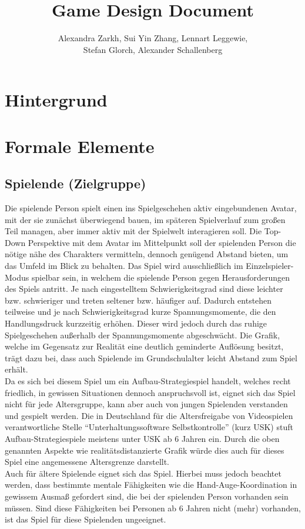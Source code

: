 \documentclass[paper=A4,pagesize=auto,12pt,headinclude=true,footinclude=true,BCOR=0mm,DIV=calc]{scrartcl}
\title{Game Design Document}
\author{Alexandra Zarkh, Sui Yin Zhang, Lennart Leggewie,\\ Stefan Glorch, Alexander Schallenberg}
\newcommand{\sectionspace}{
	\vspace{0.5cm}
}
\begin{document}
	
\begin{titlepage}
	\maketitle
\end{titlepage}


\tableofcontents
\newpage

\section{Hintergrund}\label{sec:Hintergrund}

\sectionspace
\section{Formale Elemente}\label{sec:Formale_Elemente}

\sectionspace
\subsection{Spielende (Zielgruppe)}\label{sec:Spieler}
Die spielende Person spielt einen ins Spielgeschehen aktiv eingebundenen Avatar, mit der sie zunächst überwiegend bauen, im späteren Spielverlauf zum großen Teil managen, aber immer aktiv mit der Spielwelt interagieren soll. Die Top-Down Perspektive mit dem Avatar im Mittelpunkt soll der spielenden Person die nötige nähe des Charakters vermitteln, dennoch genügend Abstand bieten, um das Umfeld im Blick zu behalten. Das Spiel wird ausschließlich im Einzelspieler-Modus spielbar sein, in welchem die spielende Person gegen Herausforderungen des Spiels antritt. Je nach eingestelltem Schwierigkeitsgrad sind diese leichter bzw. schwieriger und treten seltener bzw. häufiger auf. Dadurch entstehen teilweise und je nach Schwierigkeitsgrad kurze Spannungsmomente, die den Handlungsdruck kurzzeitig erhöhen. Dieser wird jedoch durch das ruhige Spielgeschehen außerhalb der Spannungsmomente abgeschwächt. Die Grafik, welche im Gegensatz zur Realität eine deutlich geminderte Auflösung besitzt, trägt dazu bei, dass auch Spielende im Grundschulalter leicht Abstand zum Spiel erhält.\\ %
Da es sich bei diesem Spiel um ein Aufbau-Strategiespiel handelt, welches recht friedlich, in gewissen Situationen dennoch anspruchsvoll ist, eignet sich das Spiel nicht für jede Altersgruppe, kann aber auch von jungen Spielenden verstanden und gespielt werden. Die in Deutschland für die Altersfreigabe von Videospielen verantwortliche Stelle ``Unterhaltungssoftware Selbstkontrolle'' (kurz USK) stuft Aufbau-Strategiespiele meistens unter USK ab 6 Jahren \cite{usk_6} ein. Durch die oben genannten Aspekte wie realitätsdistanzierte Grafik würde dies auch für dieses Spiel eine angemessene Altersgrenze darstellt. \\ 
Auch für ältere Spielende eignet sich das Spiel. Hierbei muss jedoch beachtet werden, dass bestimmte mentale Fähigkeiten wie die Hand-Auge-Koordination in gewissem Ausmaß gefordert sind, die bei der spielenden Person vorhanden sein müssen. Sind diese Fähigkeiten bei Personen ab 6 Jahren nicht (mehr) vorhanden, ist das Spiel für diese Spielenden ungeeignet.
\end{document}
